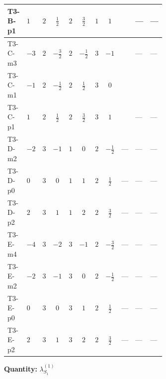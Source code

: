 \documentclass[8pt]{article}
\begin{document}
\begin{landscape}
\begin{longtable}{@{}llcccccc >{\raggedright\arraybackslash}p{0.21\linewidth} >{\raggedright\arraybackslash}p{0.21\linewidth} >{\raggedright\arraybackslash}p{0.21\linewidth}@{}}
\midrule
T3-B-p1 & $1$ & $2$ & $\frac{1}{2}$ & $2$ & $\frac{3}{2}$ & $1$ & $1$ & \scriptsize\adjustbox{max width=\linewidth}{$\begin{gathered} +\frac{{\lambda_{HS_1}^{(A)}}^2}{4}\end{gathered}$} & --- & --- \\
\midrule
T3-C-m3 & $-3$ & $2$ & $-\frac{3}{2}$ & $2$ & $-\frac{1}{2}$ & $3$ & $-1$ & \scriptsize\adjustbox{max width=\linewidth}{$\begin{gathered} +\frac{{\lambda_{HS_1}^{(A)}}^2}{4}\end{gathered}$} & --- & --- \\
\midrule
T3-C-m1 & $-1$ & $2$ & $-\frac{1}{2}$ & $2$ & $\frac{1}{2}$ & $3$ & $0$ & \scriptsize\adjustbox{max width=\linewidth}{$\begin{gathered} +\frac{{\lambda_{HS_1}^{(A)}}^2}{4}\end{gathered}$} & \scriptsize\adjustbox{max width=\linewidth}{$\begin{gathered} +{\lambda_{11}} (3 \operatorname{Tr}\!\left({y_1}\,\left({y_2}\right)^{\dagger}\right)+24 \left({\lambda_{11}}\right)^{*})\end{gathered}$} & \scriptsize\adjustbox{max width=\linewidth}{$\begin{gathered} +3 \left({\lambda_{11}}\right)^{*} \operatorname{Tr}\!\left({y_2}\,\left({y_1}\right)^{\dagger}\right)\end{gathered}$} \\
\midrule
T3-C-p1 & $1$ & $2$ & $\frac{1}{2}$ & $2$ & $\frac{3}{2}$ & $3$ & $1$ & \scriptsize\adjustbox{max width=\linewidth}{$\begin{gathered} +\frac{{\lambda_{HS_1}^{(A)}}^2}{4}\end{gathered}$} & --- & --- \\
\midrule
T3-D-m2 & $-2$ & $3$ & $-1$ & $1$ & $0$ & $2$ & $-\frac{1}{2}$ & --- & --- & --- \\
\midrule
T3-D-p0 & $0$ & $3$ & $0$ & $1$ & $1$ & $2$ & $\frac{1}{2}$ & --- & --- & --- \\
\midrule
T3-D-p2 & $2$ & $3$ & $1$ & $1$ & $2$ & $2$ & $\frac{3}{2}$ & --- & --- & --- \\
\midrule
T3-E-m4 & $-4$ & $3$ & $-2$ & $3$ & $-1$ & $2$ & $-\frac{3}{2}$ & --- & --- & --- \\
\midrule
T3-E-m2 & $-2$ & $3$ & $-1$ & $3$ & $0$ & $2$ & $-\frac{1}{2}$ & --- & --- & --- \\
\midrule
T3-E-p0 & $0$ & $3$ & $0$ & $3$ & $1$ & $2$ & $\frac{1}{2}$ & --- & --- & --- \\
\midrule
T3-E-p2 & $2$ & $3$ & $1$ & $3$ & $2$ & $2$ & $\frac{3}{2}$ & --- & --- & --- \\
\midrule
\bottomrule
\end{longtable}
\clearpage
\noindent\textbf{Quantity: }$\lambda_{S_1}^{(1)}$\par\smallskip

\end{landscape}
\end{document}

